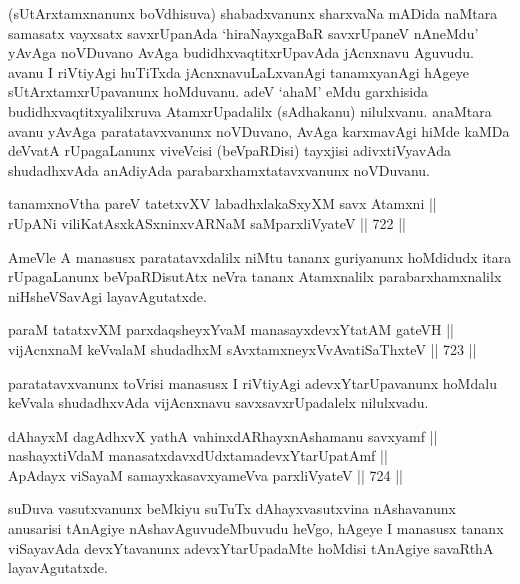 \begin{artha} 
(sUtArxtamxnanunx boVdhisuva) shabadxvanunx sharxvaNa mADida naMtara 
samasatx vayxsatx savxrUpanAda `hiraNayxgaBaR savxrUpaneV nAneMdu' 
yAvAga noVDuvano AvAga budidhxvaqtitxrUpavAda jAcnxnavu Aguvudu. avanu 
I riVtiyAgi huTiTxda jAcnxnavuLaLxvanAgi tanamxyanAgi hAgeye 
sUtArxtamxrUpavanunx hoMduvanu. adeV `ahaM' eMdu garxhisida 
budidhxvaqtitxyalilxruva AtamxrUpadalilx (sAdhakanu) nilulxvanu. 
anaMtara avanu yAvAga paratatavxvanunx noVDuvano, AvAga karxmavAgi 
hiMde kaMDa deVvatA rUpagaLanunx viveVcisi (beVpaRDisi) tayxjisi 
adivxtiVyavAda shudadhxvAda anAdiyAda parabarxhamxtatavxvanunx noVDuvanu.
\end{artha}

\begin{shl}
tanamxnoV\s tha pareV tatetxvXV labadhxlakaSxyXM savx Atamxni || \\
rUpANi viliKatAsxkASxninxvARNaM saMparxliVyateV \hfill || 722 ||  
\end{shl}

\begin{artha} 
AmeVle A manasusx paratatavxdalilx niMtu tananx guriyanunx hoMdidudx itara rUpagaLanunx beVpaRDisutAtx neVra tananx Atamxnalilx parabarxhamxnalilx niHsheVSavAgi layavAgutatxde.
\end{artha}

\begin{shl}
paraM tatatxvXM parxdaqsheyxYvaM manasayxdevxYtatAM gateVH || \\
vijAcnxnaM keVvalaM shudadhxM sAvxtamxneyxVvAvatiSaThxteV \hfill || 723 ||  
\end{shl}

\begin{artha} 
paratatavxvanunx toVrisi manasusx I riVtiyAgi adevxYtarUpavanunx hoMdalu keVvala shudadhxvAda vijAcnxnavu savxsavxrUpadalelx nilulxvadu.
\end{artha}

\begin{shl}
dAhayxM dagAdhxvX yathA vahinxdARhayxnAshamanu savxyamf || \\
nashayxtiVdaM manasatxdavxdUdxtamadevxYtarUpatAmf || \\
ApAdayx viSayaM samayxkasavxyameVva parxliVyateV \hfill || 724 ||  
\end{shl}

\begin{artha} 
suDuva vasutxvanunx beMkiyu suTuTx dAhayxvasutxvina nAshavanunx anusarisi tAnAgiye nAshavAguvudeMbuvudu heVgo, hAgeye I manasusx tananx viSayavAda devxYtavanunx adevxYtarUpadaMte hoMdisi tAnAgiye savaRthA layavAgutatxde.
\end{artha}

